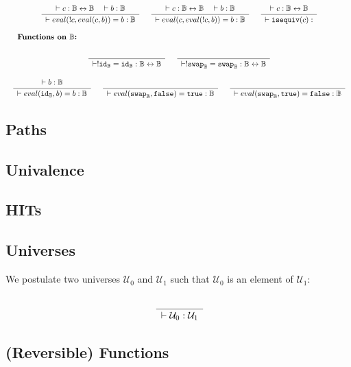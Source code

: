 \documentclass[format=acmlarge,review,natbib]{acmart}
\newcommand{\invc}[1]{!#1}
\newcommand{\evalone}[2]{eval(#1,#2)}
\newcommand{\isequiv}[1]{\mathtt{isequiv}(#1)}
\newcommand{\idc}{\mathtt{id}}
\newcommand{\swapc}{\mathtt{swap}}
\newcommand{\iso}{\leftrightarrow}
\newcommand{\fc}{\mathtt{false}}
\newcommand{\tc}{\mathtt{true}}
\newcommand{\boolt}{\mathbb{B}}
\newcommand{\uzero}{\mathcal{U}_0}
\newcommand{\uone}{\mathcal{U}_1}
\newcommand{\Rule}[2]{
\makebox{
$\displaystyle
\frac{\begin{array}{l}#1\\\end{array}}
{\begin{array}{l}#2\\\end{array}}$}}
\newcommand{\proves}{\vdash}
\newcommand{\jdg}[3]{#1 \proves #2 : #3}
\begin{document}
\[\begin{array}{c}
\Rule{\jdg{}{c}{\boolt\iso\boolt}
         \quad\jdg{}{b}{\boolt}}
        {\jdg{}{\evalone{\invc{c}}{\evalone{c}{b}} = b}{\boolt}}
\quad
\Rule{\jdg{}{c}{\boolt\iso\boolt}
         \quad\jdg{}{b}{\boolt}}
        {\jdg{}{\evalone{c}{\evalone{\invc{c}}{b}} = b}{\boolt}}
\quad
\Rule{\jdg{}{c}{\boolt\iso\boolt}}
        {\jdg{}{\isequiv{c}}{}}
\\
\\
\noalign{\textbf{Functions on $\boolt$:}} \\
\Rule{}{\jdg{}{\invc{\idc_{\boolt} = \idc_{\boolt}}}{\boolt\iso\boolt}}
\quad
\Rule{}{\jdg{}{\invc{\swapc _{\boolt}} = \swapc _{\boolt}}{\boolt\iso\boolt}}
\\
\\
\Rule{\jdg{}{b}{\boolt}}
        {\jdg{}{\evalone{\idc_{\boolt}}{b} = b}{\boolt}}
\quad
\Rule{}
        {\jdg{}{\evalone{\swapc_{\boolt}}{\fc} = \tc}{\boolt}}
\quad
\Rule{}
        {\jdg{}{\evalone{\swapc_{\boolt}}{\tc} = \fc}{\boolt}}
\end{array}\]

\subsection{Paths}

\subsection{Univalence}

\subsection{HITs}

\newpage

\subsection{Universes}

We postulate two universes $\uzero$ and $\uone$ such that $\uzero$ is an element
of $\uone$:

\[
\Rule{}{\jdg{}{\uzero}{\uone}}
\]

\subsection{(Reversible) Functions}
\end{document}
